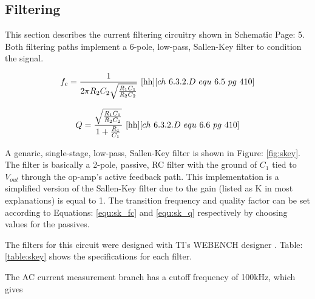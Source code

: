 \subsection{Filtering}
\label{sec:filtering}
\nocite{kirk_skey}

This section describes the current filtering circuitry shown in Schematic Page: 5. Both filtering paths implement a 6-pole, low-pass, Sallen-Key filter to condition the signal.



\begin{equation}
    \label{equ:sk_fc}
    f_c = \frac{1}{2\pi R_2C_2\sqrt{\frac{R_1C_1}{R_2C_2}}}
    ~\cite{hh}[ch~6.3.2.D~equ~6.5~pg~410]
\end{equation}

\begin{equation}
    \label{equ:sk_q}
    Q = \frac{\sqrt{\frac{R_1C_1}{R_2C_2}}}{1 + \frac{R_1}{C_1}}
    ~\cite{hh}[ch~6.3.2.D~equ~6.6~pg~410]
\end{equation}

A genaric, single-stage, low-pass, Sallen-Key filter is shown in Figure: \ref{fig:skey}. The filter is basically a 2-pole, passive, RC filter with the ground of $C_1$ tied to $V_{out}$ through the op-amp's active feedback path. This implementation is a simplified version of the Sallen-Key filter due to the gain (listed as K in most explanations) is equal to 1. The transition frequency and quality factor can be set according to Equations: \eqref{equ:sk_fc} and \eqref{equ:sk_q} respectively by choosing values for the passives.

The filters for this circuit were designed with TI's WEBENCH designer \cite{webench}. Table: \ref{table:skey} shows the specifications for each filter. 


The AC current measurement branch has a cutoff frequency of 100kHz, which gives 




